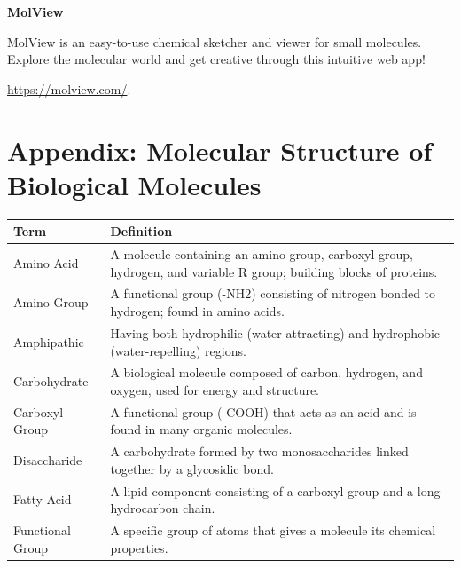 \documentclass[
  letterpaper,
  DIV=11,
  numbers=noendperiod]{scrreprt}
\newcounter{none} %
\begin{document}
\textbf{MolView}

MolView is an easy-to-use chemical sketcher and viewer for small
molecules. Explore the molecular world and get creative through this
intuitive web app!

\url{https://molview.com/}.

\section{\texorpdfstring{\textbf{Appendix: Molecular Structure of
Biological
Molecules}}{Appendix: Molecular Structure of Biological Molecules}}\label{appendix-molecular-structure-of-biological-molecules}

{\def\LTcaptype{none} %
\begin{longtable}[]{@{}
  >{\raggedright\arraybackslash}p{}
  >{\raggedright\arraybackslash}p{}@{}}
\toprule\noalign{}
\begin{minipage}[b]{\linewidth}\raggedright
\textbf{Term}
\end{minipage} & \begin{minipage}[b]{\linewidth}\raggedright
\textbf{Definition}
\end{minipage} \\
\midrule\noalign{}
\endhead
\bottomrule\noalign{}
\endlastfoot
Amino Acid & A molecule containing an amino group, carboxyl group,
hydrogen, and variable R group; building blocks of proteins. \\
Amino Group & A functional group (-NH2) consisting of nitrogen bonded to
hydrogen; found in amino acids. \\
Amphipathic & Having both hydrophilic (water-attracting) and hydrophobic
(water-repelling) regions. \\
Carbohydrate & A biological molecule composed of carbon, hydrogen, and
oxygen, used for energy and structure. \\
Carboxyl Group & A functional group (-COOH) that acts as an acid and is
found in many organic molecules. \\
Disaccharide & A carbohydrate formed by two monosaccharides linked
together by a glycosidic bond. \\
Fatty Acid & A lipid component consisting of a carboxyl group and a long
hydrocarbon chain. \\
Functional Group & A specific group of atoms that gives a molecule its
chemical properties. \\

\end{longtable}}
\end{document}
